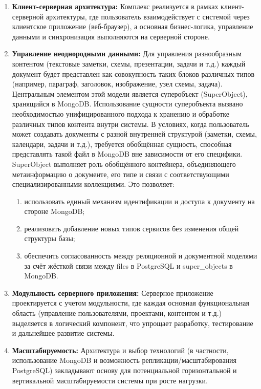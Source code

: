 \begin{enumerate}[wide=12.5mm, leftmargin=12.5mm]
\begin{enumerate}[wide=12.5mm, leftmargin=12.5mm]
        \end{enumerate}
    \item \textbf{Клиент-серверная архитектура:} Комплекс реализуется в рамках клиент-серверной архитектуры, где пользователь взаимодействует с системой через клиентское приложение (веб-браузер), а основная бизнес-логика, управление данными и синхронизация выполняются на серверной стороне.
    \item \textbf{Управление неоднородными данными:} Для управления разнообразным контентом (текстовые заметки, схемы, презентации, задачи и т.д.) каждый документ будет представлен как совокупность таких блоков различных типов (например, параграф, заголовок, изображение, узел схемы, задача). Центральным элементом этой модели является суперобъект (SuperObject), хранящийся в MongoDB. Использование сущности суперобъекта вызвано необходимостью унифицированного подхода к хранению и обработке различных типов контента внутри системы. В условиях, когда пользователь может создавать документы с разной внутренней структурой (заметки, схемы, календари, задачи и т.д.), требуется обобщённая сущность, способная представлять такой файл в MongoDB вне зависимости от его специфики. SuperObject выполняет роль обобщённого контейнера, объединяющего метаинформацию о документе, его типе и связи с соответствующими специализированными коллекциями. Это позволяет:
        \begin{enumerate}[wide=12.5mm, leftmargin=12.5mm]
            \item использовать единый механизм идентификации и доступа к документу на стороне MongoDB;
            \item реализовать добавление новых типов сервисов без изменения общей структуры базы;
            \item обеспечить согласованность между реляционной и документной моделями за счёт жёсткой связи между files в PostgreSQL и super\_objects в MongoDB.
        \end{enumerate}
    \item \textbf{Модульность серверного приложения:} Серверное приложение проектируется с учетом модульности, где каждая основная функциональная область (управление пользователями, проектами, контентом и т.д.) выделяется в логический компонент, что упрощает разработку, тестирование и дальнейшее развитие системы.
    \item \textbf{Масштабируемость:} Архитектура и выбор технологий (в частности, использование MongoDB и возможность репликации/масштабирования PostgreSQL) закладывают основу для потенциальной горизонтальной и вертикальной масштабируемости системы при росте нагрузки.
\end{enumerate}

